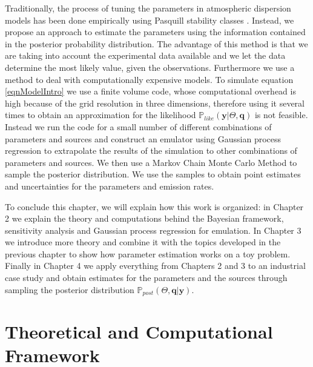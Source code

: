 \documentclass{sfuthesis}
\newcommand{\post}{\mathbb{P}_{post}}
\newcommand{\like}{\mathbb{P}_{like}}
\newcommand{\q}{\textbf{q}}
\newcommand{\y}{\textbf{y}}
\begin{document}
Traditionally, the process of tuning the parameters in atmospheric dispersion models has been done
empirically using Pasquill stability classes \cite{seinfeld1998atmospheric, turner1994workbook}.
Instead, we propose an approach to estimate
the parameters using the information contained in the posterior probability distribution. 
The advantage of this method is that we are taking into account the experimental data 
available and we let the data determine the most likely value, given the observations.
Furthermore we use a method to deal with computationally expensive models.
To simulate equation \eqref{eqnModelIntro} we use a finite volume code, whose
computational overhead is high because of the grid resolution in three dimensions, therefore using it several times to obtain an approximation for
the likelihood $\like(\y|\Theta,\q)$ is not feasible. Instead we run the code 
for a small  number of different
combinations of parameters and sources and construct an emulator using
 Gaussian process regression to extrapolate the results
of the simulation to other combinations of parameters and sources. We then use a
Markov Chain Monte Carlo Method to sample  the posterior distribution.
We  use the samples to obtain point estimates and uncertainties
for the parameters and emission rates.

To conclude this chapter, we will explain how this work is organized:
in Chapter 2 we explain the theory and computations behind the
Bayesian framework, sensitivity analysis and Gaussian process regression for
emulation. In Chapter 3 we introduce more theory and combine it with the topics 
developed in the previous chapter to show how parameter estimation works
on a toy problem. Finally in 
Chapter 4 we apply everything from Chapters 2 and 3 to an
industrial case study and obtain estimates for the parameters
and the sources through sampling the posterior distribution $\post(\Theta,\q|\y)$.






\chapter{Theoretical and Computational Framework}
\end{document}
